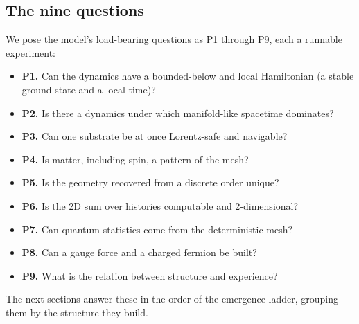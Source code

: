\subsection{The nine questions}

We pose the model's load-bearing questions as P1 through P9, each a runnable experiment:
\begin{itemize}
\item \textbf{P1.} Can the dynamics have a bounded-below and local Hamiltonian (a stable ground state and a local time)?
\item \textbf{P2.} Is there a dynamics under which manifold-like spacetime dominates?
\item \textbf{P3.} Can one substrate be at once Lorentz-safe and navigable?
\item \textbf{P4.} Is matter, including spin, a pattern of the mesh?
\item \textbf{P5.} Is the geometry recovered from a discrete order unique?
\item \textbf{P6.} Is the 2D sum over histories computable and 2-dimensional?
\item \textbf{P7.} Can quantum statistics come from the deterministic mesh?
\item \textbf{P8.} Can a gauge force and a charged fermion be built?
\item \textbf{P9.} What is the relation between structure and experience?
\end{itemize}
The next sections answer these in the order of the emergence ladder, grouping them by the structure they build.
